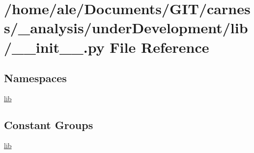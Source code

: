 \hypertarget{a00043}{\section{/home/ale/\-Documents/\-G\-I\-T/carness/\-\_\-analysis/under\-Development/lib/\-\_\-\-\_\-init\-\_\-\-\_\-.py File Reference}
\label{a00043}
}
\subsection*{Namespaces}
\begin{DoxyCompactItemize}
\item 
\hyperlink{a00102}{lib}
\end{DoxyCompactItemize}
\subsection*{Constant Groups}
\begin{DoxyCompactItemize}
\item 
\hyperlink{a00102}{lib}
\end{DoxyCompactItemize}
